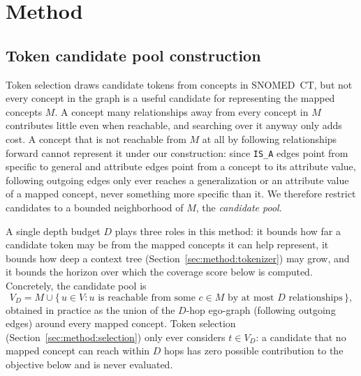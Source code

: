 \section{Method}
\label{sec:method}


\subsection{Token candidate pool construction}
\label{sec:method:candidates}
Token selection draws candidate tokens from concepts in SNOMED~CT, but not
every concept in the graph is a useful candidate for representing the
mapped concepts $M$. A concept many relationships away from every concept
in $M$ contributes little even when reachable, and searching over it
anyway only adds cost. A concept that is not reachable from $M$ at all by
following relationships forward cannot represent it under our
construction: since \texttt{IS\_A} edges point from specific to general and
attribute edges point from a concept to its attribute value, following
outgoing edges only ever reaches a generalization or an attribute value of
a mapped concept, never something more specific than it. We therefore
restrict candidates to a bounded neighborhood of $M$, the \emph{candidate
pool}.

A single depth budget $D$ plays three roles in this method: it bounds how
far a candidate token may be from the mapped concepts it can help
represent, it bounds how deep a context tree
(Section~\ref{sec:method:tokenizer}) may grow, and it bounds the horizon
over which the coverage score below is computed. Concretely, the candidate
pool is
\[
V_D = M \cup \{\, u \in V : u \text{ is reachable from some } c \in M
\text{ by at most } D \text{ relationships} \,\},
\]
obtained in practice as the union of the $D$-hop ego-graph (following
outgoing edges) around every mapped concept. Token selection
(Section~\ref{sec:method:selection}) only ever considers $t \in V_D$: a
candidate that no mapped concept can reach within $D$ hops has zero
possible contribution to the objective below and is never evaluated.

